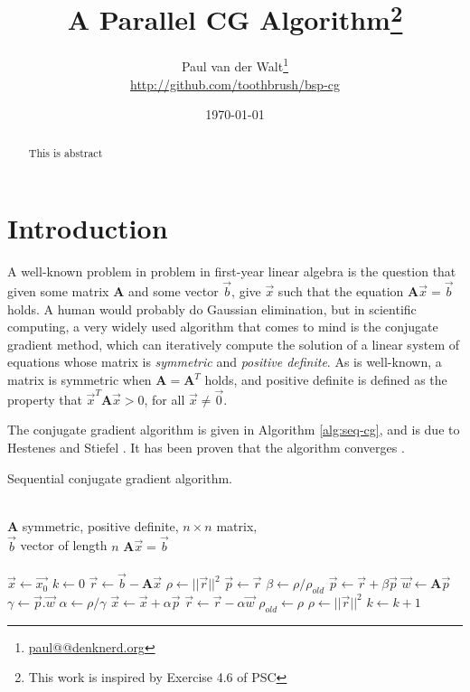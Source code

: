 \documentclass[a4paper]{article}
\author{Paul van der Walt\footnote{\url{paul@@denknerd.org}}\\ \url{http://github.com/toothbrush/bsp-cg}}
\date{\today}
\title{A Parallel CG Algorithm\footnote{This work is inspired by Exercise 4.6 of PSC\cite{bisseling2004parallel}}}
\begin{document}
\maketitle

\begin{abstract}
    This is abstract
\end{abstract}

\newcommand{\ve}[1]{\ensuremath{\vec{#1}}}
\newcommand{\mat}[1]{\ensuremath{\boldsymbol{#1}}}
\section{Introduction}

A well-known problem in problem in first-year linear algebra is the question that
given some matrix \mat{A} and some vector \ve{b}, give \ve{x} such that the equation $\mat A \ve x = \ve b$ holds. A human would probably do Gaussian elimination, but
in scientific computing, a very widely used algorithm that comes to mind is the conjugate gradient method, which can iteratively compute the solution of a linear system of equations whose matrix is \emph{symmetric} and \emph{positive definite}. 
As is well-known, a matrix is symmetric when $\mat A = \mat A^T$ holds, and positive definite is defined as the property that $\ve x^T \mat A \ve x > 0$, for all $\ve x \neq \ve 0$.

The conjugate gradient algorithm is given in Algorithm \ref{alg:seq-cg}, and is due to Hestenes and Stiefel \cite{hestenes1952methods}. It has been proven that the algorithm converges \cite{golub1996matrix}.

\begin{algorithm}
    \caption{Sequential conjugate gradient algorithm.}
\label{alg:seq-cg}
\begin{algorithmic}
    \REQUIRE ~\\
             $\mat A$ symmetric, positive definite, $n\times n$ matrix,\\
             $\ve  b$ vector of length $n$
    \ENSURE  $\mat A \ve x = \ve b$\\~\\
    \STATE $\ve x \leftarrow \ve{x_0}$ 
    \STATE $k \leftarrow 0$ 
    \STATE $\ve r \leftarrow \ve b - \mat A \ve x$
    \STATE $\rho \leftarrow ||\ve r||^2$
    \WHILE{$\sqrt{\rho} > \epsilon ||\ve b|| \wedge k < k_{max}$}
            \STATE $\ve p \leftarrow \ve r$
        \ELSE
            \STATE $\beta \leftarrow \rho/\rho_{old}$
            \STATE $\ve p \leftarrow \ve r + \beta \ve p$
        \ENDIF
        \STATE $\vec w \leftarrow \mat A \ve p$
        \STATE $\gamma \leftarrow \ve p . \ve w$
        \STATE $\alpha \leftarrow \rho/\gamma$
        \STATE $\ve x  \leftarrow \ve x + \alpha \ve p$
        \STATE $\ve r  \leftarrow \ve r - \alpha \ve w$
        \STATE $\rho_{old} \leftarrow \rho$
        \STATE $\rho   \leftarrow || \ve r || ^2$
        \STATE $k \leftarrow k+1$
    \ENDWHILE
\end{algorithmic}
\end{algorithm}
\end{document}
